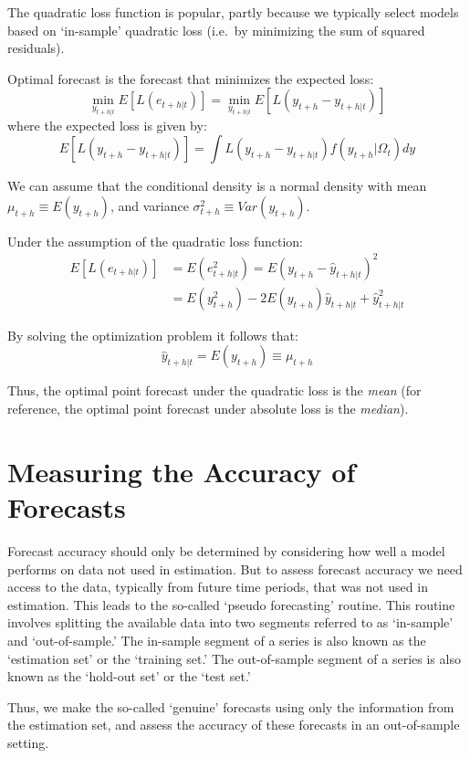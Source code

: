 \documentclass[
  12pt,
  oneside]{book}
\begin{document}
The quadratic loss function is popular, partly because we typically select models based on `in-sample' quadratic loss (i.e.~by minimizing the sum of squared residuals).

Optimal forecast is the forecast that minimizes the expected loss:
\[\min_{y_{t+h|t}} E\left[L\left(e_{t+h|t}\right)\right] = \min_{y_{t+h|t}} E\left[L\left(y_{t+h}-y_{t+h|t}\right)\right]\]
where the expected loss is given by:
\[E\left[L\left(y_{t+h}-y_{t+h|t}\right)\right]=\int L\left(y_{t+h}-y_{t+h|t}\right) f(y_{t+h}|\Omega_t)dy\]

We can assume that the conditional density is a normal density with mean \(\mu_{t+h} \equiv E(y_{t+h})\), and variance \(\sigma_{t+h}^2 \equiv Var(y_{t+h})\).

Under the assumption of the quadratic loss function:
\[\begin{aligned}
        E\left[L(e_{t+h|t})\right] & = E(e_{t+h|t}^2) = E(y_{t+h} - \hat{y}_{t+h|t})^2 \\
        & = E(y_{t+h}^2)-2E(y_{t+h})\hat{y}_{t+h|t} + \hat{y}_{t+h|t}^2
        \end{aligned}\]

By solving the optimization problem it follows that: \[\hat{y}_{t+h|t} = E(y_{t+h}) \equiv \mu_{t+h}\]

Thus, the optimal point forecast under the quadratic loss is the \emph{mean} (for reference, the optimal point forecast under absolute loss is the \emph{median}).

\hypertarget{measuring-the-accuracy-of-forecasts}{%
\section{Measuring the Accuracy of Forecasts}\label{measuring-the-accuracy-of-forecasts}}

Forecast accuracy should only be determined by considering how well a model performs on data not used in estimation. But to assess forecast accuracy we need access to the data, typically from future time periods, that was not used in estimation. This leads to the so-called `pseudo forecasting' routine. This routine involves splitting the available data into two segments referred to as `in-sample' and `out-of-sample.' The in-sample segment of a series is also known as the `estimation set' or the `training set.' The out-of-sample segment of a series is also known as the `hold-out set' or the `test set.'

Thus, we make the so-called `genuine' forecasts using only the information from the estimation set, and assess the accuracy of these forecasts in an out-of-sample setting.
\end{document}
